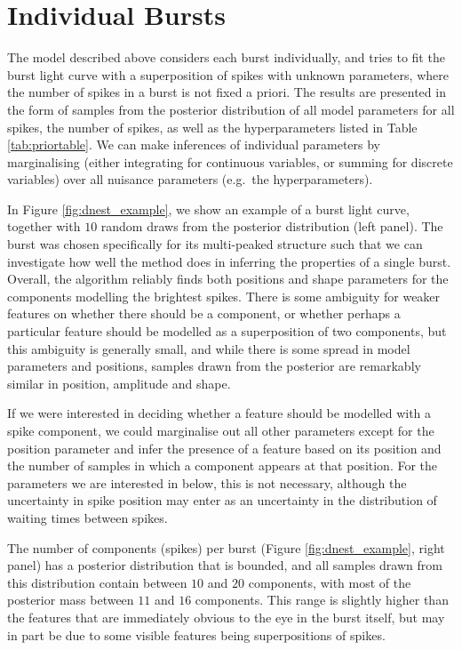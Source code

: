 \documentclass[12pt]{emulateapj}
\begin{document}
\section{Individual Bursts}
\label{ch6:oneburst}

The model described above considers each burst individually, and tries to fit the burst light curve with a superposition of spikes with unknown parameters, where the number of
spikes in a burst is not fixed a priori. The results are presented in the form of samples from the posterior distribution of all model parameters for all spikes, the number of spikes,
as well as the hyperparameters listed in Table \ref{tab:priortable}. We can make inferences of individual parameters by marginalising (either integrating for continuous variables, or summing for
discrete variables) over all nuisance parameters (e.g.\ the hyperparameters). 

In Figure \ref{fig:dnest_example}, we show an example of a burst light curve, together with $10$ random draws from the posterior distribution (left panel).
The burst was chosen specifically for its multi-peaked structure such that we can investigate how well the method does in inferring the properties 
of a single burst. Overall, the algorithm reliably finds both positions and shape parameters for the components modelling
the brightest spikes. There is some ambiguity for weaker features on whether there should be a component, or whether perhaps a
particular feature should be modelled as a superposition of two components, but this ambiguity is generally small, and while there is some
spread in model parameters and positions, samples drawn from the posterior are remarkably similar in position, amplitude and shape. 

If we were interested in deciding whether a feature should be modelled with a spike component, we could marginalise out all other parameters
except for the position parameter and infer the presence of a feature based on its position and the number of samples in which a component appears at
that position. For the parameters we are interested in below, this is not necessary, although the uncertainty in spike position may enter as an 
uncertainty in the distribution of waiting times between spikes.

The number of components (spikes) per burst (Figure \ref{fig:dnest_example}, right panel) has a posterior distribution that is bounded, and all samples drawn
from this distribution contain between $10$ and $20$ components, with most of the posterior mass between $11$ and $16$ components. This range is slightly higher than the features that are immediately obvious to the eye 
in the burst itself, but may in part be due to some visible features being superpositions of spikes. 
\end{document}
